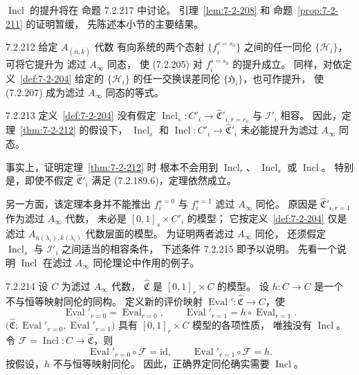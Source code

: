 $\operatorname{Incl}$ 的提升将在
命题 7.2.217 中讨论。
引理~\ref{lem:7-2-208} 和
命题~\ref{prop:7-2-211} 的证明暂缓，
先陈述本小节的主要结果。

\begin{theorem}{7.2.212}\label{thm:7-2-212}
给定 $A_{(\bar n,\bar k)}$ 代数
有向系统的两个态射
$\{f_i^{s=s_0}\}$ 之间的任一同伦
$\{\mathcal H_i\}$，可将它提升为
滤过 $A_\infty$ 同态，
使 (7.2.205) 对 $f_i^{s=s_0}$ 的提升成立。
同样，对依定义~\ref{def:7-2-204}
给定的 $\{\mathcal H_i\}$ 的任一交换误差同伦
$\{\mathfrak H_i\}$，也可作提升，
使 (7.2.207) 成为滤过
$A_\infty$ 同态的等式。
\end{theorem}

\begin{remark}{7.2.213}\label{rem:7-2-213}
定义~\ref{def:7-2-204} 没有假定
$\operatorname{Incl}_s\colon C'_i\to
\widehat{\mathfrak C}'_{i,r=r_0}$
与 $\mathcal I'_i$ 相容。
因此，定理~\ref{thm:7-2-212} 的假设下，
$\operatorname{Incl}_s$ 和
$\operatorname{Incl}\colon C'_i\to
\widehat{\mathfrak C}'_i$
未必能提升为滤过 $A_\infty$ 同态。

事实上，证明定理~\ref{thm:7-2-212} 时
根本不会用到 $\operatorname{Incl}_r$、
$\operatorname{Incl}_s$ 或
$\operatorname{Incl}$。
特别是，即使不假定
$\widehat{\mathfrak C}'_i$ 满足
(7.2.189.6)，定理依然成立。

另一方面，该定理本身并不能推出
$f_i^{s=0}$ 与 $f_i^{s=1}$
滤过 $A_\infty$ 同伦。
原因是 $\widehat{\mathfrak C}'_{i,r=1}$
作为滤过 $A_\infty$ 代数，
未必是 $[0,1]_s\times C'_i$ 的模型；
它按定义~\ref{def:7-2-204}
仅是滤过
$A_{\bar n(\lambda_i),\bar k(\lambda_i)}$
代数层面的模型。
为证明两者滤过 $A_\infty$ 同伦，
还须假定 $\operatorname{Incl}_s$ 与
$\mathcal I'_i$ 之间适当的相容条件，
下述条件 7.2.215 即予以说明。
先看一个说明 $\operatorname{Incl}$
在滤过 $A_\infty$ 同伦理论中作用的例子。
\end{remark}

\begin{example}{7.2.214}\label{ex:7-2-214}
设 $C$ 为滤过 $A_\infty$ 代数，
$\widehat{\mathfrak C}$ 是
$[0,1]_r\times C$ 的模型。
设 $h\colon C\to C$ 是一个
不与恒等映射同伦的同构。
定义新的评价映射
$\operatorname{Eval}'\colon
\widehat{\mathfrak C}\to C$，使
\[
\operatorname{Eval}'_{r=0}
=\operatorname{Eval}_{r=0},
\qquad
\operatorname{Eval}'_{r=1}
=h\circ\operatorname{Eval}_{r=1}.
\]
$\bigl(\widehat{\mathfrak C};
\operatorname{Eval}'_{r=0},
\operatorname{Eval}'_{r=1}\bigr)$
具有 $[0,1]_r\times C$ 模型的各项性质，
唯独没有 $\operatorname{Incl}$。
令 $\mathcal F=\operatorname{Incl}
\colon C\to\widehat{\mathfrak C}$，则
\[
\operatorname{Eval}'_{r=0}\circ\mathcal F
=\mathrm{id},
\qquad
\operatorname{Eval}'_{r=1}\circ\mathcal F=h.
\]
按假设，$h$ 不与恒等映射同伦。
因此，正确界定同伦确实需要
$\operatorname{Incl}$。
\end{example}

